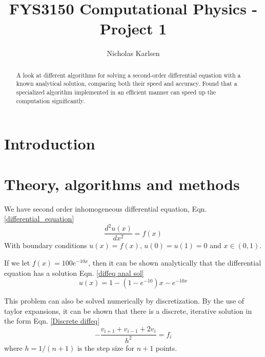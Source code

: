 \documentclass[10pt,showpacs,preprintnumbers,footinbib,amsmath,amssymb,aps,prl,twocolumn,groupedaddress,superscriptaddress,showkeys]{revtex4-1}
\begin{document}
\title{FYS3150 Computational Physics - Project 1}
\author{Nicholas Karlsen}

\begin{abstract}
  A look at different algorithms for solving a second-order differential equation with a known analytical solution, comparing both their speed and accuracy. Found that a specialized algorithm implemented in an efficient manner can speed up the computation significantly.
\end{abstract}

\maketitle

\section{Introduction}

\section{Theory, algorithms and methods}
We have second order inhomogeneous differential equation, Eqn. \ref{differential_equation}
  \begin{equation}
    \label{differential_equation}
    \frac{d^2u(x)}{dx^2} = f(x)
  \end{equation}
  With boundary conditions $\ddot{u}(x) = f(x)$, $u(0) = u(1) = 0$ and $x \in (0, 1)$.

  If we let $f(x) = 100e^{-10x}$, then it can be shown analytically that the differential equation has a solution Eqn. \ref{diffeq anal sol}
  \begin{equation}
    \label{diffeq anal sol}
    u(x) = 1 - (1 - e^{-10})x - e^{-10x}
  \end{equation}

  This problem can also be solved numerically by discretization. By the use of taylor expansions, it can be shown that there is a discrete, iterative solution in the form Eqn. \ref{Discrete diffeq} \cite{lecture_notes}
  \begin{equation}
    \label{Discrete diffeq}
    - \frac{v_{i+1} + v_{i-1} + 2v_i}{h^2} = f_i
  \end{equation}
  where $h = 1/(n+1)$ is the step size for $n+1$ points.
\end{document}
